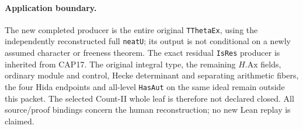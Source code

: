 \paragraph{Application boundary.}
The new completed producer is the entire original \texttt{TThetaEx},
using the independently reconstructed full \texttt{neatU}; its output
is not conditional on a newly assumed character or freeness theorem.
The exact residual \texttt{IsRes} producer is inherited from CAP17.
The original integral type, the remaining $H.\mathrm{Ax}$ fields,
ordinary module and control, Hecke determinant and separating
arithmetic fibers, the four Hida endpoints and all-level
\texttt{HasAut} on the same ideal remain outside this packet.
The selected Count-II whole leaf is therefore not declared closed.
All source/proof bindings concern the human reconstruction; no new
Lean replay is claimed.
